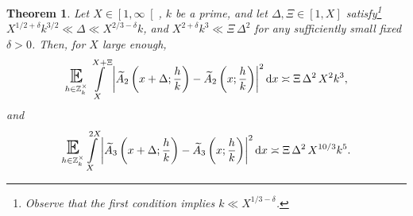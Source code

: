 \documentclass[a4paper,10pt,twoside]{amsart}
\newtheorem{theorem}{Theorem}[section]
\theoremstyle{definition}
\numberwithin{equation}{section}
\newcommand\E{\mathbb{E}}
\renewcommand\:{\colon}
\begin{document}
\begin{theorem}\label{short-mean-square}
Let $X\in\left[1,\infty\right[$, $k$ be a prime, and let $\Delta,\Xi\in\left[1,X\right]$ satisfy\footnote{Observe that the first condition implies $k\ll X^{1/3-\delta}$.} $X^{1/2+\delta}k^{3/2}\ll\Delta\ll X^{2/3-\delta}k$, and $X^{2+\delta}k^3\ll\Xi\,\Delta^2$ for any sufficiently small fixed $\delta>0$.
Then, for $X$ large enough,
\[\mathop{\text{\LARGE$\E$}}_{h\in\mathbb Z_k^\times}\int\limits_X^{X+\Xi}\left|\widetilde A_2\left(x+\Delta;\frac hk\right)-\widetilde A_2\left(x;\frac hk\right)\right|^2\mathrm dx\asymp\Xi\,\Delta^2\,X^2k^3,\]
and
\[\mathop{\text{\LARGE$\E$}}_{h\in\mathbb Z_k^\times}\int\limits_X^{2X}\left|\widetilde A_3\left(x+\Delta;\frac hk\right)-\widetilde A_3\left(x;\frac hk\right)\right|^2\mathrm dx\asymp\Xi\,\Delta^2\,X^{10/3}k^5.\]
\end{theorem}
\end{document}
